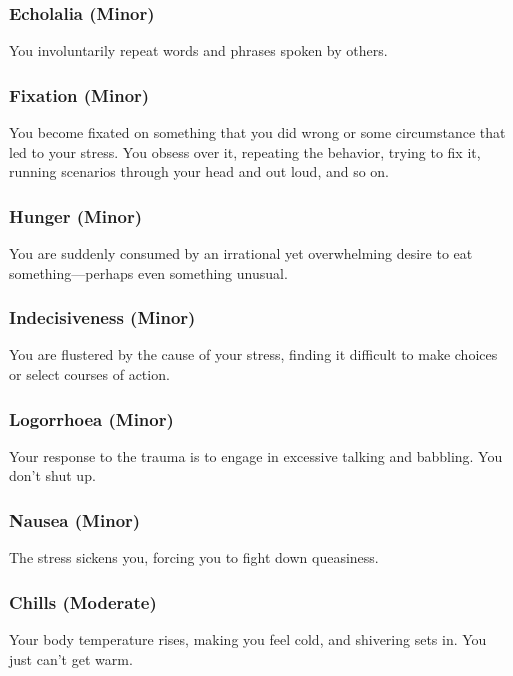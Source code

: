 \subsubsection{Echolalia (Minor)}

You involuntarily repeat words and phrases spoken 
by others.

\subsubsection{Fixation (Minor)}

You become fixated on something that you did wrong 
or some circumstance that led to your stress. You 
obsess over it, repeating the behavior, trying to fix it, 
running scenarios through your head and out loud, 
and so on.

\subsubsection{Hunger (Minor)}

You are suddenly consumed by an irrational yet 
overwhelming desire to eat something—perhaps even 
something unusual.

\subsubsection{Indecisiveness (Minor)}

You are flustered by the cause of your stress, finding it 
difficult to make choices or select courses of action.

\subsubsection{Logorrhoea (Minor)}

Your response to the trauma is to engage in excessive 
talking and babbling. You don't shut up.

\subsubsection{Nausea (Minor)}

The stress sickens you, forcing you to fight  down 
queasiness.

\subsubsection{Chills (Moderate)}

Your body temperature rises, making you feel cold, 
and shivering sets in. You just can't get warm.

